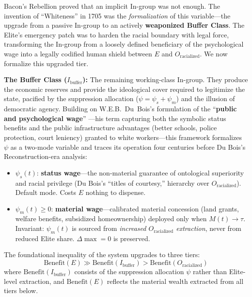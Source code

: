 \documentclass[12pt,openany]{book}
\begin{document}
Bacon's Rebellion proved that an implicit In-group was not enough. The invention of ``Whiteness'' in 1705 was the \textit{formalization} of this variable---the upgrade from a passive In-group to an actively \textbf{weaponized Buffer Class}. The Elite's emergency patch was to harden the racial boundary with legal force, transforming the In-group from a loosely defined beneficiary of the psychological wage into a legally codified human shield between $E$ and $O_{\text{racialized}}$. We now formalize this upgraded tier.

\begin{definition}
\textbf{The Buffer Class ($I_{\text{buffer}}$):} The remaining working-class In-group. They produce the economic reserves and provide the ideological cover required to legitimize the state, pacified by the suppression allocation ($\psi = \psi_s + \psi_m$) and the illusion of democratic agency. Building on W.E.B.\ Du~Bois's formulation of the ``\textbf{public and psychological wage}'' \cite{dubois}---his term capturing both the symbolic status benefits and the public infrastructure advantages (better schools, police protection, court leniency) granted to white workers---this framework formalizes $\psi$ as a two-mode variable and traces its operation four centuries before Du Bois's Reconstruction-era analysis:

\begin{itemize}
    \item $\psi_s(t)$: \textbf{status wage}---the non-material guarantee of ontological superiority and racial privilege (Du Bois's ``titles of courtesy,'' hierarchy over $O_{\text{racialized}}$). Default mode. Costs $E$ nothing to dispense.
    \item $\psi_m(t) \geq 0$: \textbf{material wage}---calibrated material concession (land grants, welfare benefits, subsidized homeownership) deployed only when $M(t) \to \tau$. Invariant: $\psi_m(t)$ is sourced from \textit{increased $O_{\text{racialized}}$ extraction}, never from reduced Elite share. $\Delta\max = 0$ is preserved.
\end{itemize}
\end{definition}

The foundational inequality of the system upgrades to three tiers:
\[
\text{Benefit}(E) \gg \text{Benefit}(I_{\text{buffer}}) > \text{Benefit}(O_{\text{racialized}})
\]
where $\text{Benefit}(I_{\text{buffer}})$ consists of the suppression allocation $\psi$ rather than Elite-level extraction, and $\text{Benefit}(E)$ reflects the material wealth extracted from all tiers below.
\end{document}
